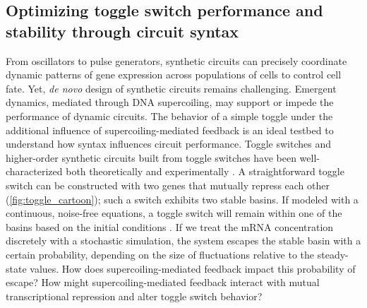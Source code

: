 \documentclass[11pt]{article}
\begin{document}
\FloatBarrier
\subsection{Optimizing toggle switch performance and stability through circuit syntax}
From oscillators to pulse generators, synthetic circuits can  precisely coordinate dynamic patterns of gene expression across populations of cells to control cell fate. Yet, \textit{de novo}
design of synthetic circuits remains challenging. Emergent dynamics, mediated through DNA supercoiling, may support or impede the performance of dynamic circuits. The behavior of a simple toggle under the additional influence of supercoiling-mediated feedback is an ideal testbed to understand how syntax influences circuit performance.
Toggle switches and higher-order synthetic circuits built from toggle switches have been well-characterized both theoretically \parencite{gardnerConstructionGeneticToggle2000} and experimentally \parencite{yeungBiophysicalConstraintsArising2017,zhuSyntheticMultistabilityMammalian2021}.
A straightforward toggle switch can be constructed with two genes that mutually repress each other (\cref{fig:toggle_cartoon}); such a switch exhibits two stable basins. If modeled with a continuous, noise-free equations, a toggle switch will remain within one of the basins based on the initial conditions \parencite{gardnerConstructionGeneticToggle2000}. If  we treat the mRNA concentration discretely with a stochastic simulation, the system escapes the stable basin with a certain probability, depending on the size of fluctuations relative to the steady-state values. How does supercoiling-mediated feedback impact this probability of escape? How might supercoiling-mediated feedback interact with mutual transcriptional repression and alter toggle switch behavior?
\end{document}
